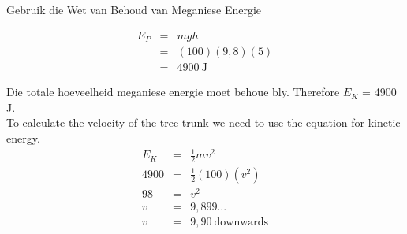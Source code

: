 \begin{wex}{Gebruik die Wet van Behoud van Meganiese Energie}
{
\begin{eqnarray*}
E_{P} &=& mgh\\
&=& (100)(9,8)(5)\\
&=& 4900~\text{J}
\end{eqnarray*}

Die totale hoeveelheid meganiese energie moet behoue bly. Therefore $E_{K}$ = 4900 J.\\

To calculate the velocity of the tree trunk we need to use the equation for kinetic energy.
\begin{eqnarray*}
E_{K} & = & \frac{1}{2}mv^2 \\
4900 &=& \frac{1}{2} (100) (v^2) \\
98 &=& v^2\\
v &=& 9,899...\\
v &=& 9,90 \ \text{downwards}
\end{eqnarray*}}
\end{wex}
    \noindent
\par
            \label{m38786*secfhsst!!!underscore!!!id2130}\vspace{.5cm} 
      \noindent
